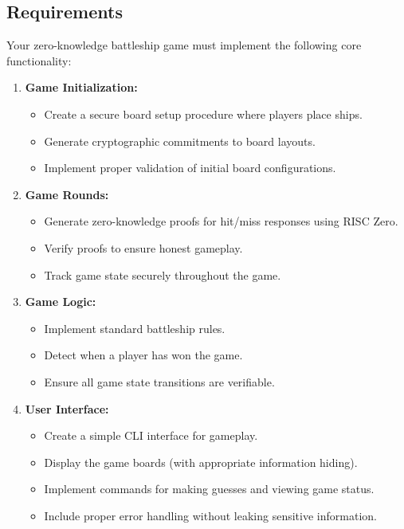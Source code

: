 \documentclass[10pt,a4paper,american]{article}
\begin{document}
\subsection*{Requirements}
Your zero-knowledge battleship game must implement the following core functionality:

\begin{enumerate}
	\item \textbf{Game Initialization:}
	      \begin{itemize}
		      \item Create a secure board setup procedure where players place ships.
		      \item Generate cryptographic commitments to board layouts.
		      \item Implement proper validation of initial board configurations.
	      \end{itemize}

	\item \textbf{Game Rounds:}
	      \begin{itemize}
		      \item Generate zero-knowledge proofs for hit/miss responses using RISC Zero.
		      \item Verify proofs to ensure honest gameplay.
		      \item Track game state securely throughout the game.
	      \end{itemize}

	\item \textbf{Game Logic:}
	      \begin{itemize}
		      \item Implement standard battleship rules.
		      \item Detect when a player has won the game.
		      \item Ensure all game state transitions are verifiable.
	      \end{itemize}

	\item \textbf{User Interface:}
	      \begin{itemize}
		      \item Create a simple CLI interface for gameplay.
		      \item Display the game boards (with appropriate information hiding).
		      \item Implement commands for making guesses and viewing game status.
		      \item Include proper error handling without leaking sensitive information.
	      \end{itemize}
\end{enumerate}
\end{document}
